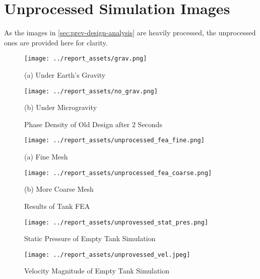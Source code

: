 \chapter{Unprocessed Simulation Images}\label{sec:unprocessed-images}
As the images in \autoref{sec:prev-design-analysis} are heavily processed, the unprocessed ones are provided here for clarity.
\begin{figure}[htbp]
    \centering

    \begin{minipage}{0.45\textwidth}
        \centering
        \texttt{[image: ../report\_assets/grav.png]}
        \caption*{(a) Under Earth's Gravity}
    \end{minipage}
    \hfill
    \begin{minipage}{0.45\textwidth}
        \centering
        \texttt{[image: ../report\_assets/no\_grav.png]}
        \caption*{(b) Under Microgravity}
    \end{minipage}
    \caption{Phase Density of Old Design after 2 Seconds}
\end{figure}

\begin{figure}[htbp]
    \centering

    \begin{minipage}{0.45\textwidth}
        \centering
        \texttt{[image: ../report\_assets/unprocessed\_fea\_fine.png]}
        \caption*{(a) Fine Mesh}
    \end{minipage}    
    \hfill
    \begin{minipage}{0.45\textwidth}
        \centering
        \texttt{[image: ../report\_assets/unprocessed\_fea\_coarse.png]}
        \caption*{(b) More Coarse Mesh}
    \end{minipage}    
    \caption{Results of Tank FEA}

\end{figure}  

\begin{figure}[htbp]
    \centering

    \begin{minipage}{0.8\textwidth}
        \centering
        \texttt{[image: ../report\_assets/unprovessed\_stat\_pres.png]}
        \caption{Static Pressure of Empty Tank Simulation}
    \end{minipage}    
\end{figure}  

\begin{figure}[htbp]
    \centering
    \begin{minipage}{0.8\textwidth}
        \centering
        \texttt{[image: ../report\_assets/unprovessed\_vel.jpeg]}
        \caption{Velocity Magnitude of Empty Tank Simulation}
    \end{minipage}    
\end{figure}  

